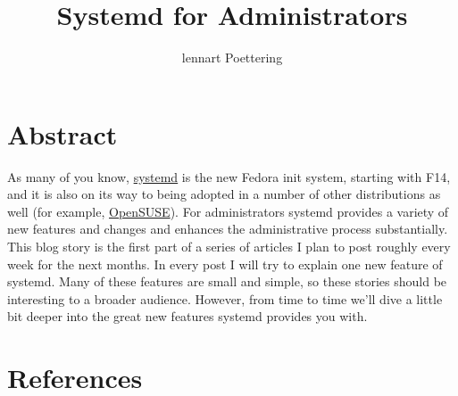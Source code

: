 \documentclass[titlepage]{article}
\title{Systemd for Administrators}
\author{lennart Poettering}
\begin{document}
\maketitle
\tableofcontents
\newpage

\section{Abstract}
As many of you know,
\href{https://www.freedesktop.org/wiki/Software/systemd}{systemd} is the new
Fedora init system, starting with F14, and it is also on its way to being
adopted in a number of other distributions as well (for example,
\href{https://en.opensuse.org/SDB:Systemd}{OpenSUSE}). For administrators
systemd provides a variety of new features and changes and enhances the
administrative process substantially. This blog story is the first part of a
series of articles I plan to post roughly every week for the next months. In
every post I will try to explain one new feature of systemd. Many of these
features are small and simple, so these stories should be interesting to a
broader audience. However, from time to time we'll dive a little bit deeper
into the great new features systemd provides you with.  
\section{References}
\nocite{*}


\listoffigures
\end{document}
